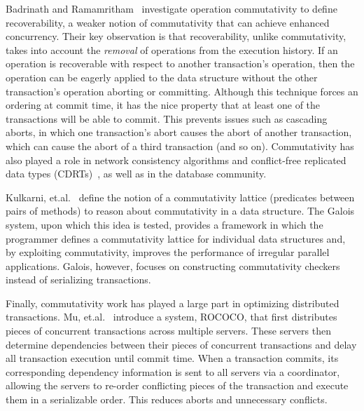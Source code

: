 Badrinath and Ramamritham~\cite{badrinath} investigate operation commutativity to define recoverability, a weaker notion of commutativity that can achieve enhanced concurrency. Their key observation is that recoverability, unlike commutativity, takes into account the \emph{removal} of operations from the execution history. If an operation is recoverable with respect to another transaction's operation, then the operation can be eagerly applied to the data structure without the other transaction's operation aborting or committing. Although this technique forces an ordering at commit time, it has the nice property that at least one of the transactions will be able to commit. This prevents issues such as cascading aborts, in which one transaction's abort causes the abort of another transaction, which can cause the abort of a third transaction (and so on).
Commutativity has also played a role in network consistency algorithms and conflict-free replicated data types (CDRTs)~\cite{CRDT}, as well as in the database community.

Kulkarni, et.al.~\cite{galois} define the notion of a commutativity lattice (predicates between pairs of methods) to reason about commutativity in a data structure. The Galois system, upon which this idea is tested, provides a framework in which the programmer defines a commutativity lattice for individual data structures and, by exploiting commutativity, improves the performance of irregular parallel applications. Galois, however, focuses on constructing commutativity checkers instead of serializing transactions.

Finally, commutativity work has played a large part in optimizing distributed transactions. Mu, et.al.~\cite{distributed} introduce a system, ROCOCO, that first distributes pieces of concurrent transactions across multiple servers. These servers then determine dependencies between their pieces of concurrent transactions and delay all transaction execution until commit time. When a transaction commits, its corresponding dependency information is sent to all servers via a coordinator, allowing the servers to re-order conflicting pieces of the transaction and execute them in a serializable order. This reduces aborts and unnecessary conflicts.
